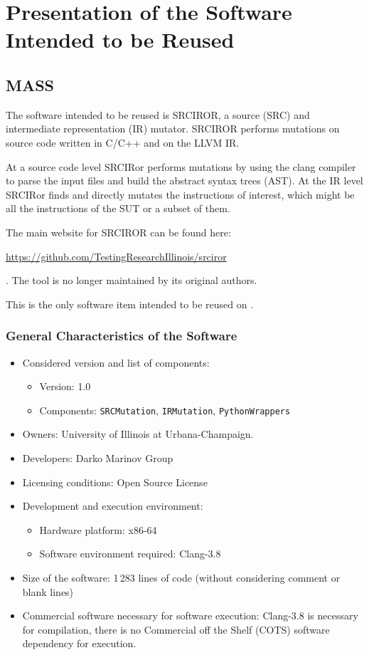 
\chapter{Presentation of the Software Intended to be Reused}

\section{MASS}
\label{sec:mass:reuse}

The software intended to be reused is SRCIROR, a source (SRC) and intermediate representation (IR) mutator. SRCIROR performs mutations on source code written in C/C++ and on the LLVM IR.

At a source code level SRCIRor performs mutations by using the clang compiler to parse the input files and build the abstract syntax trees (AST). At the IR level SRCIRor finds and directly mutates the instructions of interest, which might be all the instructions of the SUT or a subset of them. 

The main website for SRCIROR can be found here: \begin{scriptsize}\url{https://github.com/TestingResearchIllinois/srciror}\end{scriptsize}. The tool is no longer maintained by its original authors.

This is the only software item intended to be reused on \MASS.

\subsection{General Characteristics of the Software}

\begin{itemize}
	\item Considered version and list of components:
	\begin{itemize}
		\item Version: 1.0
		\item Components: \texttt{SRCMutation}, \texttt{IRMutation}, \texttt{PythonWrappers}
	\end{itemize}
	\item Owners: University of Illinois at Urbana-Champaign.
	\item Developers: Darko Marinov Group
	\item Licensing conditions: Open Source License
	\item Development and execution environment:
	\begin{itemize}
		\item Hardware platform: x86-64
		\item Software environment required: Clang-3.8
	\end{itemize}
	\item Size of the software: 1\,283 lines of code (without considering comment or blank lines)
	\item Commercial software necessary for software execution: Clang-3.8 is necessary for compilation, there is no Commercial off the Shelf (COTS) software dependency for execution.
\end{itemize}

